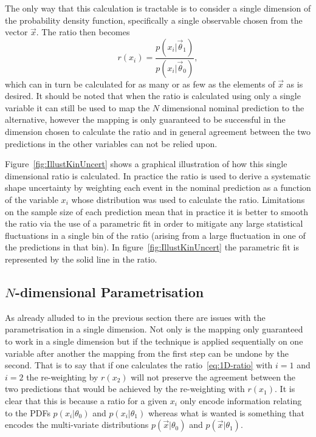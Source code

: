The only way that this calculation is tractable is to consider a single
dimension of the probability density function, specifically a single observable
chosen from the vector $\vec{x}$. The ratio then becomes
\begin{equation}
  r(x_{i}) = \frac{p(x_{i}|\vec{\theta}_{1})}{p(x_{i}|\vec{\theta}_{0})},
  \label{eq:1D-ratio}
\end{equation}
which can in turn be calculated for as many or as few as the elements of
$\vec{x}$ as is desired. It should be noted that when the ratio is calculated
using only a single variable it can still be used to map the $N$ dimensional
nominal prediction to the alternative, however the mapping is only guaranteed to
be successful in the dimension chosen to calculate the ratio and in general
agreement between the two predictions in the other variables can not be relied
upon.

Figure~\ref{fig:IllustKinUncert} shows a graphical illustration of how this
single dimensional ratio is calculated. In practice the ratio is used to derive
a systematic shape uncertainty by weighting each event in the nominal
prediction as a function of the variable $x_{i}$ whose distribution was used to
calculate the ratio. Limitations on the sample size of each prediction mean that
in practice it is better to smooth the ratio via the use of a parametric fit in
order to mitigate any large statistical fluctuations in a single bin of the
ratio (arising from a large fluctuation in one of the predictions in that bin).
In figure~\ref{fig:IllustKinUncert} the parametric fit is represented by the
solid line in the ratio.


\subsection{$N$-dimensional Parametrisation}
\label{sec:ND-reweight}

As already alluded to in the previous section there are issues with the
parametrisation in a single dimension. Not only is the mapping only guaranteed
to work in a single dimension but if the technique is applied sequentially on
one variable after another the mapping from the first step can be undone by the
second. That is to say that if one calculates the ratio~\ref{eq:1D-ratio} with
$i=1$ and $i=2$ the re-weighting by $r(x_2)$ will not preserve the agreement
between the two predictions that would be achieved by the re-weighting with
$r(x_1)$. It is clear that this is because a ratio for a given $x_i$ only encode
information relating to the PDFs $p(x_i|\theta_0)$ and $p(x_i|\theta_1)$ whereas
what is wanted is something that encodes the multi-variate distributions
$p(\vec{x}|\theta_0)$ and $p(\vec{x}|\theta_1)$.

